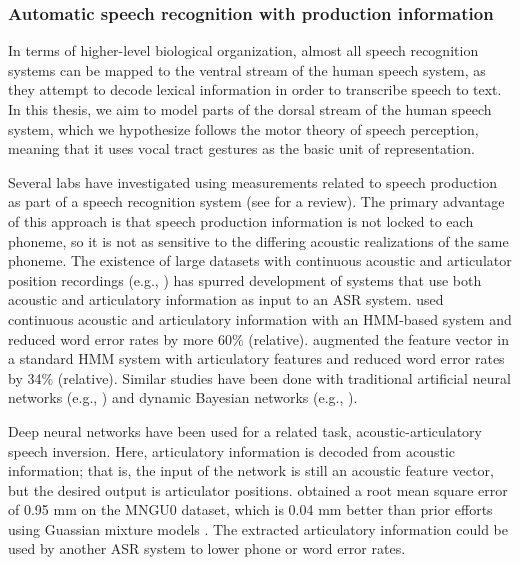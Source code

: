 \subsubsection{Automatic speech recognition with production information}
\label{sec:asr-prod}

In terms of higher-level biological organization,
almost all speech recognition systems
can be mapped
to the ventral stream of the human speech system,
as they attempt to decode
lexical information in order to
transcribe speech to text.
In this thesis, we aim to model
parts of the dorsal stream of the human speech system,
which we hypothesize follows the
motor theory of speech perception,
meaning that it uses vocal tract gestures
as the basic unit of representation.

Several labs have investigated
using measurements
related to speech production
as part of a speech recognition system
(see \citealt{king2007} for a review).
The primary advantage of this approach
is that speech production information
is not locked to each phoneme,
so it is not as sensitive to the
differing acoustic realizations
of the same phoneme.
The existence of large datasets
with continuous acoustic
and articulator position recordings
(e.g., \citealt{westbury1990,wrench2000,steiner2012})
has spurred development of
systems that use both
acoustic and articulatory information
as input to an ASR system.
\citet{zlokarnik1995}
used continuous acoustic and articulatory
information with an HMM-based system
and reduced word error rates
by more 60\% (relative).
\citet{eide2001}
augmented the feature vector
in a standard HMM system
with articulatory features and
reduced word error rates
by 34\% (relative).
Similar studies have been done
with traditional artificial neural networks
(e.g., \citealt{kirchhoff2002})
and dynamic Bayesian networks
(e.g., \citealt{stephenson2000,stephenson2004}).

Deep neural networks have been used for
a related task,
acoustic-articulatory speech inversion.
Here, articulatory information
is decoded from acoustic information;
that is, the input of the network
is still an acoustic feature vector,
but the desired output
is articulator positions.
\citet{uria2011}
obtained a root mean square error
of 0.95 mm on the MNGU0 dataset,
which is 0.04 mm better than prior
efforts using Guassian mixture models
\citep{richmond2009}.
The extracted articulatory information
could be used by another ASR system
to lower phone or word error rates.

